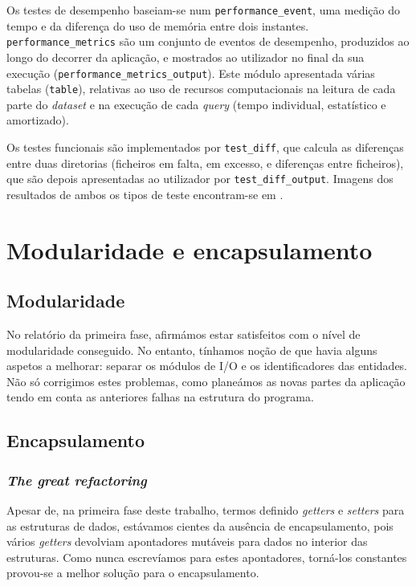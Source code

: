 \documentclass[12pt, a4paper]{article}
\begin{document}
Os testes de desempenho baseiam-se num \texttt{performance\_event}, uma medição do tempo e da
diferença do uso de memória entre dois instantes. \texttt{performance\_metrics} são um conjunto de
eventos de desempenho, produzidos ao longo do decorrer da aplicação, e mostrados ao utilizador no
final da sua execução (\texttt{performance\_metrics\_output}). Este módulo apresentada várias
tabelas (\texttt{table}), relativas ao uso de recursos computacionais na leitura de cada parte do
\emph{dataset} e na execução de cada \emph{query} (tempo individual, estatístico e amortizado).

Os testes funcionais são implementados por \texttt{test\_diff}, que calcula as diferenças entre
duas diretorias (ficheiros em falta, em excesso, e diferenças entre ficheiros), que são depois
apresentadas ao utilizador por \texttt{test\_diff\_output}. Imagens dos resultados de ambos os tipos
de teste encontram-se em .

\section{Modularidade e encapsulamento}
\label{sec:modularity-and-encapsulation}

\subsection{Modularidade}
\label{sec:modularity}

No relatório da primeira fase, afirmámos estar satisfeitos com o nível de modularidade conseguido.
No entanto, tínhamos noção de que havia alguns aspetos a melhorar: separar os módulos de I/O e os
identificadores das entidades. Não só corrigimos estes problemas, como planeámos as novas partes da
aplicação tendo em conta as anteriores falhas na estrutura do programa.

\subsection{Encapsulamento}
\label{sec:encapsulation}

\subsubsection{\emph{The great refactoring}}
\label{sec:the-great-refactoring}

Apesar de, na primeira fase deste trabalho, termos definido \emph{getters} e \emph{setters} para as
estruturas de dados, estávamos cientes da ausência de encapsulamento, pois vários \emph{getters}
devolviam apontadores mutáveis para dados no interior das estruturas. Como nunca escrevíamos para
estes apontadores, torná-los constantes provou-se a melhor solução para o encapsulamento.
\end{document}
